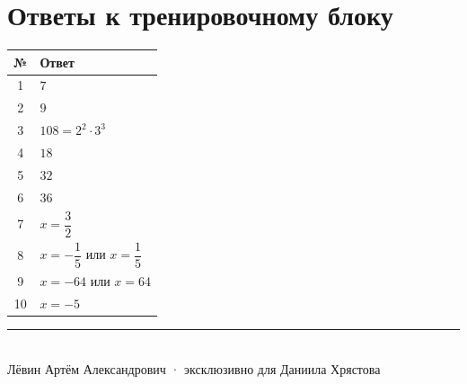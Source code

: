 \documentclass[a4paper,12pt]{article}
\begin{document}
\section*{Ответы к тренировочному блоку}
\renewcommand{\arraystretch}{1.7}
\begin{center}
\begin{tabularx}{\linewidth}{@{}c X@{}}
\toprule
\textbf{№} & \textbf{Ответ} \\
\midrule
1 & $7$ \\
2 & $9$ \\
3 & $108=2^2\cdot3^3$ \\
4 & $18$ \\
5 & $32$ \\
6 & $36$ \\
7 & $x=\dfrac32$ \\
8 & $x=-\dfrac15$ или $x=\dfrac15$ \\
9 & $x=-64$ или $x=64$ \\
10 & $x=-5$ \\
\bottomrule
\end{tabularx}
\end{center}
\vfill
\begin{center}
\textcolor{darkaccent}{\rule{45mm}{.6pt}}\\
{\small Лёвин Артём Александрович · эксклюзивно для Даниила Хрястова}
\end{center}
\end{document}
